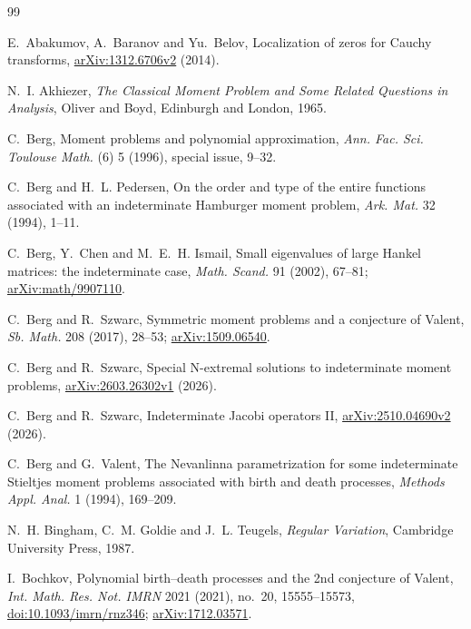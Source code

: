 \begin{thebibliography}{99}\small

E.~Abakumov, A.~Baranov and Yu.~Belov, Localization of zeros for Cauchy transforms,
\href{https://arxiv.org/abs/1312.6706}{arXiv:1312.6706v2} (2014).

N.~I. Akhiezer, \emph{The Classical Moment Problem and Some Related Questions in Analysis},
Oliver and Boyd, Edinburgh and London, 1965.

C.~Berg, Moment problems and polynomial approximation, \emph{Ann. Fac. Sci. Toulouse Math.}
(6) 5 (1996), special issue, 9--32.

C.~Berg and H.~L. Pedersen, On the order and type of the entire functions associated with an
indeterminate Hamburger moment problem, \emph{Ark. Mat.} 32 (1994), 1--11.

C.~Berg, Y.~Chen and M.~E.~H. Ismail, Small eigenvalues of large Hankel matrices: the
indeterminate case, \emph{Math. Scand.} 91 (2002), 67--81;
\href{https://arxiv.org/abs/math/9907110}{arXiv:math/9907110}.

C.~Berg and R.~Szwarc, Symmetric moment problems and a conjecture of Valent, \emph{Sb. Math.}
208 (2017), 28--53; \href{https://arxiv.org/abs/1509.06540}{arXiv:1509.06540}.

C.~Berg and R.~Szwarc, Special N-extremal solutions to indeterminate moment problems,
\href{https://arxiv.org/abs/2603.26302}{arXiv:2603.26302v1} (2026).

C.~Berg and R.~Szwarc, Indeterminate Jacobi operators II,
\href{https://arxiv.org/abs/2510.04690}{arXiv:2510.04690v2} (2026).

C.~Berg and G.~Valent, The Nevanlinna parametrization for some indeterminate Stieltjes moment
problems associated with birth and death processes, \emph{Methods Appl. Anal.} 1 (1994),
169--209.

N.~H. Bingham, C.~M. Goldie and J.~L. Teugels, \emph{Regular Variation}, Cambridge University
Press, 1987.

I.~Bochkov, Polynomial birth--death processes and the 2nd conjecture of Valent,
\emph{Int. Math. Res. Not. IMRN} 2021 (2021), no.~20, 15555--15573,
\href{https://doi.org/10.1093/imrn/rnz346}{doi:10.1093/imrn/rnz346};
\href{https://arxiv.org/abs/1712.03571}{arXiv:1712.03571}.


\end{thebibliography}
